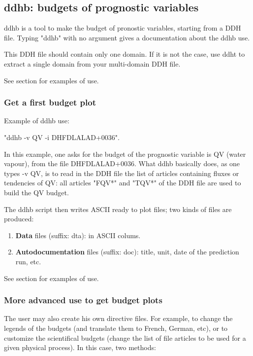\subsection{ddhb: budgets of prognostic variables}

\p ddhb is a tool to make the budget of pronostic variables, starting from a DDH file.
Typing "ddhb" with no argument gives a documentation about the ddhb use.

\p This DDH file should contain only one domain. If it is not the case, use ddht to extract a single
domain from your multi-domain DDH file.

\p See section  for examples of use.

\subsubsection{Get a first budget plot}

\p Example of ddhb use: 

\p "ddhb -v QV -i DHFDLALAD+0036".

\p In this example, one asks for the budget of the prognostic 
variable is QV (water vapour), from the file DHFDLALAD+0036.
What ddhb basically does, as one types -v QV, is to read in the DDH file the list of articles
containing fluxes or tendencies of QV: all articles "FQV*" and "TQV*" 
of the DDH file are used to build the QV budget.

\p The ddhb script then writes ASCII ready to plot files; two kinds of files are produced:
\begin{enumerate}
  \item {\bf Data} files (suffix: dta): in ASCII colums.
  \item {\bf Autodocumentation} files (suffix: doc): title, unit, date of the prediction run, etc.
\end{enumerate}

\p See section  for examples of use.

\subsubsection{More advanced use to get budget plots}

\p The user may also create his own directive files. For example, to change the legends 
of the budgets (and translate
them to French, German, etc), or to customize the scientifical budgets (change the list
of file articles to be used for a given physical process). In this case, two methods:

